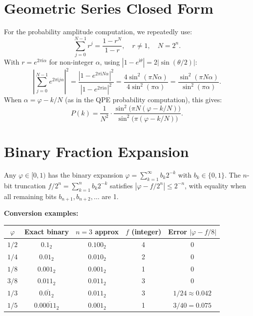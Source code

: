 \documentclass[12pt,a4paper]{article}
\newcommand{\QPE}{\textsc{QPE}}
\newcommand{\ii}{\mathrm{i}}
\begin{document}
\section{Geometric Series Closed Form}
\label{app:geosum}

For the probability amplitude computation, we repeatedly use:
\[
  \sum_{j=0}^{N-1} r^j = \frac{1-r^N}{1-r}, \quad r \neq 1, \quad N = 2^n.
\]
With $r = e^{2\pi\ii\alpha}$ for non-integer $\alpha$, using
$|1 - e^{\ii\theta}| = 2|\sin(\theta/2)|$:
\[
  \left|\sum_{j=0}^{N-1}e^{2\pi\ii j\alpha}\right|^2
  = \frac{|1-e^{2\pi\ii N\alpha}|^2}{|1-e^{2\pi\ii\alpha}|^2}
  = \frac{4\sin^2(\pi N\alpha)}{4\sin^2(\pi\alpha)}
  = \frac{\sin^2(\pi N\alpha)}{\sin^2(\pi\alpha)}.
\]
When $\alpha = \varphi - k/N$ (as in the \QPE{} probability computation), this gives:
\[
  P(k) = \frac{1}{N^2}\cdot\frac{\sin^2\!\bigl(\pi N(\varphi - k/N)\bigr)}{\sin^2\!\bigl(\pi(\varphi-k/N)\bigr)}.
\]

\section{Binary Fraction Expansion}
\label{app:binary}

Any $\varphi\in[0,1)$ has the binary expansion
$\varphi = \sum_{k=1}^{\infty} b_k 2^{-k}$ with $b_k\in\{0,1\}$.
The $n$-bit truncation $f/2^n = \sum_{k=1}^n b_k 2^{-k}$ satisfies
$|\varphi - f/2^n| \leq 2^{-n}$, with equality when all remaining bits
$b_{n+1}, b_{n+2}, \ldots$ are 1.

\textbf{Conversion examples:}
\begin{center}
\begin{tabular}{@{}ccccc@{}}
\toprule
$\varphi$ & Exact binary & $n=3$ approx & $f$ (integer) & Error $|\varphi - f/8|$ \\
\midrule
$1/2$   & $0.1_2$           & $0.100_2$ & 4 & $0$ \\
$1/4$   & $0.01_2$          & $0.010_2$ & 2 & $0$ \\
$1/8$   & $0.001_2$         & $0.001_2$ & 1 & $0$ \\
$3/8$   & $0.011_2$         & $0.011_2$ & 3 & $0$ \\
$1/3$   & $0.\overline{01}_2$ & $0.011_2$ & 3 & $1/24\approx0.042$ \\
$1/5$   & $0.0\overline{0011}_2$ & $0.001_2$ & 1 & $3/40=0.075$ \\
\bottomrule
\end{tabular}
\end{center}
\end{document}

